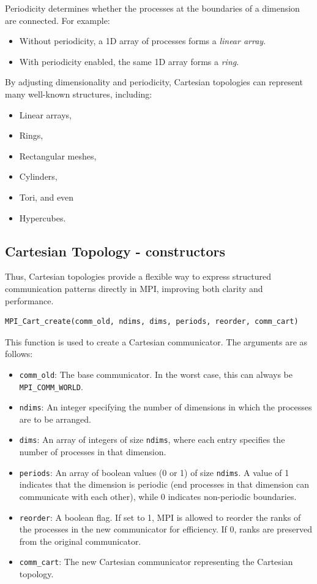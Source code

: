 \documentclass[12pt]{book}
\begin{document}
Periodicity determines whether the processes at the boundaries of a dimension are connected. For example:
\begin{itemize}
    \item Without periodicity, a 1D array of processes forms a \emph{linear array}.
    \item With periodicity enabled, the same 1D array forms a \emph{ring}.
\end{itemize}

By adjusting dimensionality and periodicity, Cartesian topologies can represent many well-known structures, including:
\begin{itemize}
    \item Linear arrays,
    \item Rings,
    \item Rectangular meshes,
    \item Cylinders,
    \item Tori, and even
    \item Hypercubes.
\end{itemize}

\subsection{Cartesian Topology - constructors}
Thus, Cartesian topologies provide a flexible way to express structured communication patterns directly in MPI, improving both clarity and performance.

\begin{lstlisting}[style=cppstyle]
MPI_Cart_create(comm_old, ndims, dims, periods, reorder, comm_cart)
\end{lstlisting}

This function is used to create a Cartesian communicator. The arguments are as follows:
\begin{itemize}
    \item \texttt{comm\_old}: The base communicator. In the worst case, this can always be \texttt{MPI\_COMM\_WORLD}.
    \item \texttt{ndims}: An integer specifying the number of dimensions in which the processes are to be arranged.
    \item \texttt{dims}: An array of integers of size \texttt{ndims}, where each entry specifies the number of processes in that dimension.
    \item \texttt{periods}: An array of boolean values (0 or 1) of size \texttt{ndims}. A value of 1 indicates that the dimension is periodic (end processes in that dimension can communicate with each other), while 0 indicates non-periodic boundaries.
    \item \texttt{reorder}: A boolean flag. If set to 1, MPI is allowed to reorder the ranks of the processes in the new communicator for efficiency. If 0, ranks are preserved from the original communicator.
    \item \texttt{comm\_cart}: The new Cartesian communicator representing the Cartesian topology.
\end{itemize}
\end{document}
